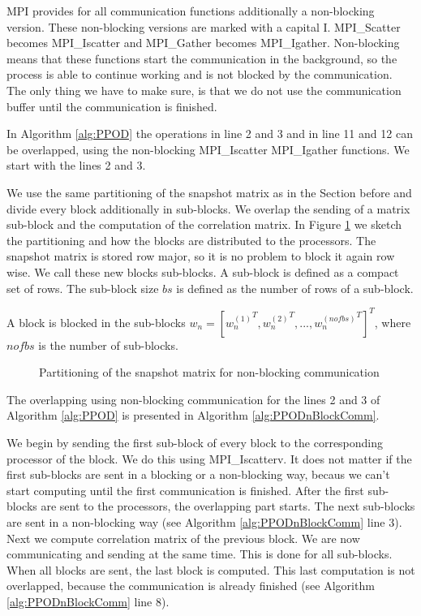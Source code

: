 MPI provides for all communication functions additionally a non-blocking version.  
These non-blocking versions are marked with a capital I.
MPI\_Scatter becomes MPI\_Iscatter and MPI\_Gather becomes MPI\_Igather.
Non-blocking means that these functions start the communication in the background, so the process is able to continue working and is not blocked by the communication. The only thing we have to make sure, is that we do not use the communication buffer until the communication is finished.

In Algorithm \ref{alg:PPOD} the operations in line 2 and 3 and in line 11 and 12  can be overlapped, using the non-blocking MPI\_Iscatter  MPI\_Igather functions.
We start with the lines 2 and 3.

We use the same partitioning of the snapshot matrix as in the Section before and divide every block additionally in sub-blocks.
We overlap the sending of a matrix sub-block and the computation of the correlation matrix.
In Figure \ref{fig:Bild1} we sketch the partitioning and how the blocks are distributed to the processors. 
The snapshot matrix is stored row major, so it is no problem to block it again row wise.
We call these new blocks sub-blocks.
A sub-block is defined as a compact set of rows. The sub-block size $bs$ is defined as the number of rows of a sub-block.

A block is blocked in the sub-blocks $ w_n = [{w_n^{(1)}}^T, {w_n^{(2)}}^T, ..., {w_n^{(nofbs)}}^T]^T $, where $nofbs$ is the number of sub-blocks.

\begin{figure}[H]
	\centering
	
	\caption[Partitioning snapshot matrix]{Partitioning of the snapshot matrix for non-blocking communication}
	\label{fig:Bild1}
\end{figure}

The overlapping using non-blocking communication for the lines 2 and 3 of Algorithm \ref{alg:PPOD} is presented in Algorithm \ref{alg:PPODnBlockComm}.

We begin by sending the first sub-block of every block to the corresponding processor of the block.
We do this using MPI\_Iscatterv.
It does not matter if the first sub-blocks are sent in a blocking or a non-blocking way, becaus we can't start computing until the first communication is finished. 
After the first sub-blocks are sent to the processors, the overlapping part starts.
The next sub-blocks are sent in a non-blocking way (see Algorithm \ref{alg:PPODnBlockComm} line 3).
Next we compute correlation matrix of the previous block.
We are now communicating and sending at the same time.
This is done for all sub-blocks.
When all blocks are sent, the last block is computed.
This last computation is not overlapped, because the communication is already finished (see Algorithm \ref{alg:PPODnBlockComm} line 8).

